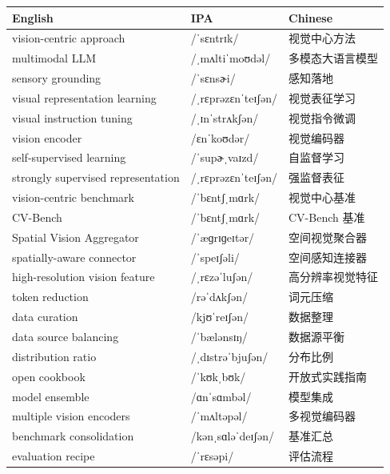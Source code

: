 \documentclass[UTF8,12pt,a4paper]{ctexart}
\providecommand{\zh}[1]{#1}
\begin{document}
\begin{tabular*}{\textwidth}{@{\extracolsep{\fill}}lll@{}}
\toprule
\textbf{English} & \textbf{IPA} & \textbf{Chinese} \\
\midrule
vision-centric approach & {\ipafont /ˈsɛntrɪk/} & \zh{视觉中心方法} \\
multimodal LLM & {\ipafont /ˌmʌltiˈmoʊdəl/} & \zh{多模态大语言模型} \\
sensory grounding & {\ipafont /ˈsɛnsɚi/} & \zh{感知落地} \\
visual representation learning & {\ipafont /ˌrɛprəzɛnˈteɪʃən/} & \zh{视觉表征学习} \\
visual instruction tuning & {\ipafont /ˌɪnˈstrʌkʃən/} & \zh{视觉指令微调} \\
vision encoder & {\ipafont /ɛnˈkoʊdər/} & \zh{视觉编码器} \\
self-supervised learning & {\ipafont /ˈsupɚˌvaɪzd/} & \zh{自监督学习} \\
strongly supervised representation & {\ipafont /ˌrɛprəzɛnˈteɪʃən/} & \zh{强监督表征} \\
vision-centric benchmark & {\ipafont /ˈbɛntʃˌmɑrk/} & \zh{视觉中心基准} \\
CV-Bench & {\ipafont /ˈbɛntʃˌmɑrk/} & \zh{CV-Bench 基准} \\
Spatial Vision Aggregator & {\ipafont /ˈæɡrɪɡeɪtər/} & \zh{空间视觉聚合器} \\
spatially-aware connector & {\ipafont /ˈspeɪʃəli/} & \zh{空间感知连接器} \\
high-resolution vision feature & {\ipafont /ˌrɛzəˈluʃən/} & \zh{高分辨率视觉特征} \\
token reduction & {\ipafont /rəˈdʌkʃən/} & \zh{词元压缩} \\
data curation & {\ipafont /kjʊˈreɪʃən/} & \zh{数据整理} \\
data source balancing & {\ipafont /ˈbælənsɪŋ/} & \zh{数据源平衡} \\
distribution ratio & {\ipafont /ˌdɪstrəˈbjuʃən/} & \zh{分布比例} \\
open cookbook & {\ipafont /ˈkʊkˌbʊk/} & \zh{开放式实践指南} \\
model ensemble & {\ipafont /ɑnˈsɑmbəl/} & \zh{模型集成} \\
multiple vision encoders & {\ipafont /ˈmʌltəpəl/} & \zh{多视觉编码器} \\
benchmark consolidation & {\ipafont /kənˌsɑləˈdeɪʃən/} & \zh{基准汇总} \\
evaluation recipe & {\ipafont /ˈrɛsəpi/} & \zh{评估流程} \\

\end{tabular*}
\end{document}

